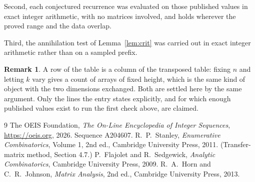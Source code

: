 \documentclass[11pt,a4paper]{article}
\theoremstyle{plain}
\theoremstyle{definition}
\newtheorem{remark}[theorem]{Remark}
\begin{document}
Second, each conjectured recurrence was evaluated on those published values in exact
integer arithmetic, with no matrices involved, and holds wherever the proved range and the
data overlap.

Third, the annihilation test of Lemma~\ref{lem:crit} was carried out in exact integer
arithmetic rather than on a sampled prefix.

\begin{remark}
A row of the table is a column of the transposed table: fixing $n$ and letting $k$ vary gives a
count of arrays of fixed height, which is the same kind of object with the two dimensions
exchanged. Both are settled here by the same argument. Only the lines the entry states
explicitly, and for which enough published values exist to run the first check above, are
claimed.
\end{remark}

\begin{thebibliography}{9}
 The OEIS Foundation, \emph{The On-Line Encyclopedia of Integer
Sequences}, \url{https://oeis.org}, 2026. Sequence A204607.
 R.~P.~Stanley, \emph{Enumerative Combinatorics}, Volume 1, 2nd ed.,
Cambridge University Press, 2011. (Transfer-matrix method, Section 4.7.)
 P.~Flajolet and R.~Sedgewick, \emph{Analytic Combinatorics}, Cambridge
University Press, 2009.
 R.~A.~Horn and C.~R.~Johnson, \emph{Matrix Analysis}, 2nd ed., Cambridge
University Press, 2013.
\end{thebibliography}
\end{document}
